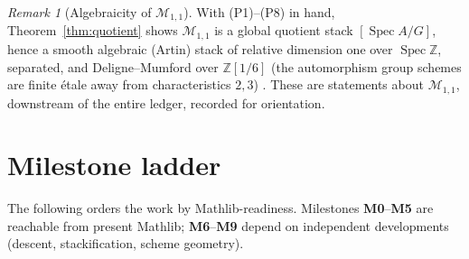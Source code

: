 \documentclass[11pt]{article}
\theoremstyle{definition}
\theoremstyle{plain}
\theoremstyle{remark}
\newtheorem{remark}[definition]{Remark}
\newcommand{\Spec}{\operatorname{Spec}}
\newcommand{\Mss}{\mathcal{M}_{1,1}}
\begin{document}
\begin{remark}[Algebraicity of $\Mss$]\label{rem:algebraicity}
With (P1)--(P8) in hand, Theorem~\ref{thm:quotient} shows $\Mss$ is a global
quotient stack $[\Spec A/G]$, hence a smooth algebraic (Artin) stack of relative
dimension one over $\Spec\mathbb Z$, separated, and Deligne--Mumford over
$\mathbb Z[1/6]$ (the automorphism group schemes are finite étale away from
characteristics $2,3$) \cite{DeligneRapoport,Olsson}.  These are statements about
$\Mss$, downstream of the entire ledger, recorded for orientation.
\end{remark}

\section{Milestone ladder}\label{sec:ladder}

The following orders the work by Mathlib-readiness.  Milestones
\textbf{M0}--\textbf{M5} are reachable from present Mathlib; \textbf{M6}--\textbf{M9}
depend on independent developments (descent, stackification, scheme geometry).
\end{document}
